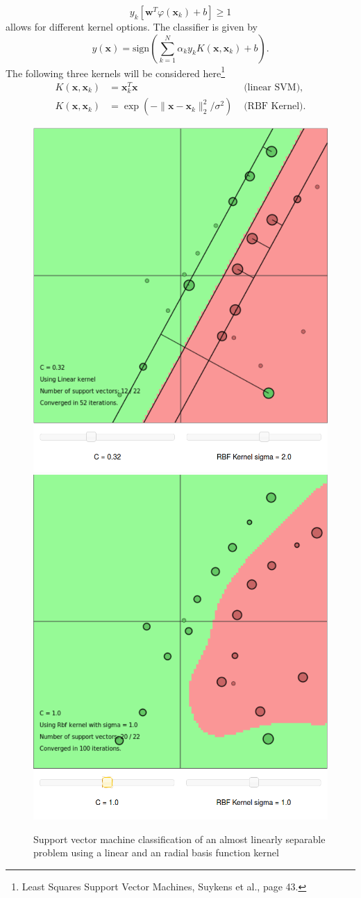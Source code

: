 \begin{equation}
y_k [\mathbf{w}^T \varphi(\mathbf{x}_k) + b] \geq 1
\end{equation}
allows for different kernel options. The classifier is given by
\begin{equation}
y(\mathbf{x}) = \text{sign}(\sum^N_{k=1} \alpha_k y_k K(\mathbf{x},\mathbf{x}_k) + b).
\end{equation}
The following three kernels will be considered here\footnote{Least Squares Support Vector Machines, Suykens et al., page 43.}
\begin{align}
K(\mathbf{x},\mathbf{x}_k)  &= \mathbf{x}_k^T \mathbf{x} &\text{  (linear SVM)}, \\
K(\mathbf{x}, \mathbf{x}_k) &= \exp (-\| \mathbf{x} - \mathbf{x}_k \|^2_2 / \sigma^2) &\text{  (RBF Kernel)}.
\end{align}

\begin{figure}
\centering
\includegraphics[width=0.33\linewidth]{../src/figure/svmjsLinSep}
\includegraphics[width=0.33\linewidth]{../src/figure/svmjsLinRBF}
\caption{Support vector machine classification of an almost linearly separable problem using a linear and an radial basis function kernel}
\label{fig:svmjsLinRBF}
\end{figure}

